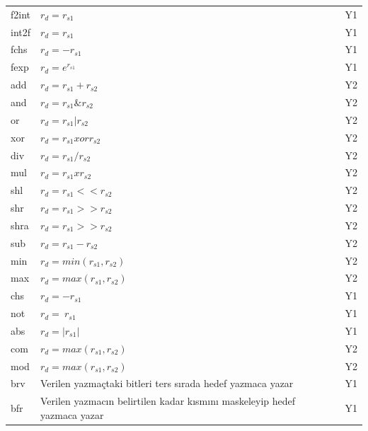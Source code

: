 \begin{longtable}{p{50pt} p{300pt} p{70pt}}
  f2int 	&	 $r_{d} = r_{s1}$ 							& \multicolumn{1}{c}{Y1}  		\\
  int2f		&	 $r_{d} = r_{s1}$ 							& \multicolumn{1}{c}{Y1}  		\\
  fchs		&	 $r_{d} = -r_{s1}$ 							& \multicolumn{1}{c}{Y1}  		\\
  fexp 		&	 $r_{d} = e^{r_{s1}}$						& \multicolumn{1}{c}{Y1}  		\\
  add 		&	 $r_{d} = r_{s1} + r_{s2}$ 			& \multicolumn{1}{c}{Y2}  		\\
  and 		&	 $r_{d} = r_{s1} \& r_{s2}$ 		& \multicolumn{1}{c}{Y2}  		\\
  or 			&	 $r_{d} = r_{s1} | r_{s2}$			& \multicolumn{1}{c}{Y2}  		\\
  xor			&	 $r_{d} = r_{s1} xor r_{s2}$ 		& \multicolumn{1}{c}{Y2}  		\\
  div  		&  $r_{d}	= r_{s1} / r_{s2}$			&	\multicolumn{1}{c}{Y2}		 	\\
  mul  		&  $r_{d} = r_{s1} x r_{s2}$			&	\multicolumn{1}{c}{Y2}		 	\\
  shl  		&  $r_{d} = r_{s1} << r_{s2}$			&	\multicolumn{1}{c}{Y2}		 	\\
  shr  		&  $r_{d} = r_{s1} >> r_{s2}$			&	\multicolumn{1}{c}{Y2}			\\
  shra  	&  $r_{d} = r_{s1} >> r_{s2}$			&	\multicolumn{1}{c}{Y2}		 	\\
  sub  		&  $r_{d} = r_{s1} - r_{s2}$			&	\multicolumn{1}{c}{Y2}		 	\\
  min  		&  $r_{d} = min(r_{s1},r_{s2})$		&	\multicolumn{1}{c}{Y2}		 	\\
  max  		&  $r_{d} = max(r_{s1},r_{s2})$		&	\multicolumn{1}{c}{Y2}		 	\\
  chs  		&  $r_{d} = -r_{s1}$							&	\multicolumn{1}{c}{Y1}		 	\\
  not  		&  $r_{d} = ~r_{s1}$							&	\multicolumn{1}{c}{Y1}		 	\\
  abs  		&  $r_{d} = |r_{s1}|$							&	\multicolumn{1}{c}{Y1}		 	\\
  com  		&  $r_{d} = max(r_{s1},r_{s2})$		& \multicolumn{1}{c}{Y2}			\\
  mod  		&  $r_{d} = max(r_{s1},r_{s2})$		& \multicolumn{1}{c}{Y2}			\\
  brv 		&	 Verilen yazmaçtaki bitleri ters sırada hedef yazmaca yazar & \multicolumn{1}{c}{Y1}  \\
  bfr 		&	 Verilen yazmacın belirtilen kadar kısmını maskeleyip hedef yazmaca yazar & \multicolumn{1}{c}{Y1}  \\

\end{longtable}
